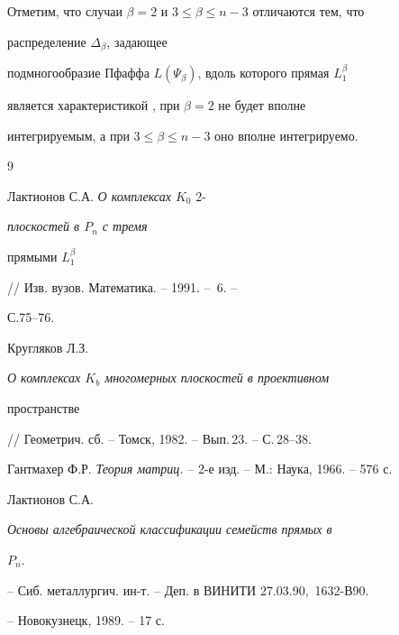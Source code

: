  


Отметим, что случаи $\beta=2$ и $3\le\beta\le n-3$ отличаются тем, что 


распределение $\Delta_\beta$, задающее 


подмногообразие Пфаффа $L(\Psi_\beta)$, вдоль которого прямая $L_1^\beta$ 


является характеристикой \cite{Kru}, при $\beta=2$ не будет вполне 


интегрируемым, а при $3\le\beta\le n-3$ оно вполне интегрируемо. 


 


\begin{thebibliography}{9} 


 




Лактионов С.А. {\em О комплексах $K_0$} 2-{\em плоскостей в $P_n$ с тремя 


прямыми $L_1^\beta$} // Изв. вузов. Математика. -- 1991. -- \No\,6. -- 


С.75--76. 


 




Кругляков Л.З. {\em О комплексах $K_b$ многомерных плоскостей в проективном 


пространстве} // Геометрич. сб. -- Томск, 1982. -- Вып.\,23. -- С.\,28--38. 


 




Гантмахер Ф.Р. {\em Теория матриц.} -- 2-е изд. -- М.: Наука, 1966. -- 576 с. 


 




Лактионов С.А. {\em Основы алгебраической классификации семейств прямых в 


$P_n$.} -- Сиб. металлургич. ин-т. -- Деп. в ВИНИТИ 27.03.90, \No\,1632-В90. 


-- Новокузнецк, 1989. -- 17 с. 


 


\end{thebibliography} 


 


\vskip 2cm 


 






 


 


